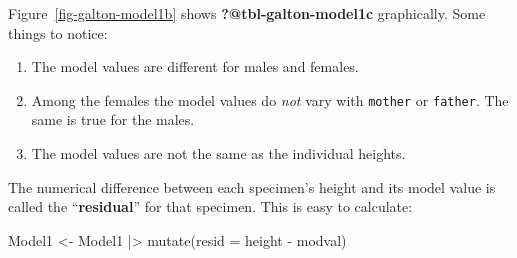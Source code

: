 \documentclass[
  letterpaper,
  DIV=11,
  numbers=noendperiod,
  oneside]{scrartcl}
\newenvironment{Shaded}{\begin{snugshade}}{\end{snugshade}}
\newcommand{\AttributeTok}[1]{\textcolor[rgb]{0.40,0.45,0.13}{#1}}
\newcommand{\FunctionTok}[1]{\textcolor[rgb]{0.28,0.35,0.67}{#1}}
\newcommand{\NormalTok}[1]{\textcolor[rgb]{0.00,0.23,0.31}{#1}}
\newcommand{\OtherTok}[1]{\textcolor[rgb]{0.00,0.23,0.31}{#1}}
\newcommand{\SpecialCharTok}[1]{\textcolor[rgb]{0.37,0.37,0.37}{#1}}
\providecommand{\tightlist}{%
  \setlength{\itemsep}{0pt}\setlength{\parskip}{0pt}}\usepackage{longtable,booktabs,array}
\begin{document}
Figure~\ref{fig-galton-model1b} shows \textbf{?@tbl-galton-model1c}
graphically. Some things to notice:

\begin{enumerate}
\def\labelenumi{\arabic{enumi}.}
\tightlist
\item
  The model values are different for males and females.
\item
  Among the females the model values do \emph{not} vary with
  \texttt{mother} or \texttt{father}. The same is true for the males.
\item
  The model values are not the same as the individual heights.
\end{enumerate}

\begin{figure}



\end{figure}%

The numerical difference between each specimen's height and its model
value is called the ``\textbf{residual}'' for that specimen. This is
easy to calculate:

\begin{Shaded}
\begin{Highlighting}[]
\NormalTok{Model1 }\OtherTok{\textless{}{-}}\NormalTok{ Model1 }\SpecialCharTok{|\textgreater{}}
  \FunctionTok{mutate}\NormalTok{(}\AttributeTok{resid =}\NormalTok{ height }\SpecialCharTok{{-}}\NormalTok{ modval)}
\end{Highlighting}
\end{Shaded}
\end{document}

